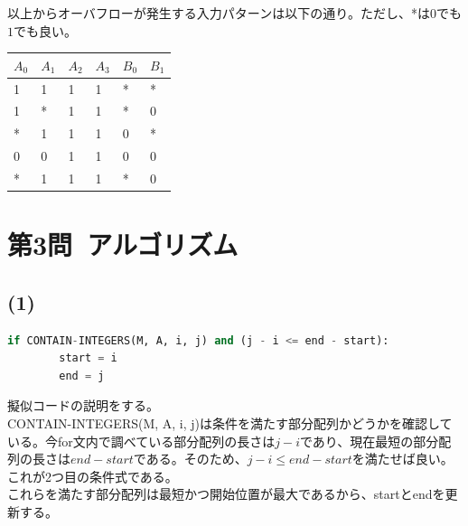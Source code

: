 \documentclass[a4paper,12pt,xelatex,ja=standard]{bxjsarticle}
\begin{document}
  以上からオーバフローが発生する入力パターンは以下の通り。ただし、*は$0$でも$1$でも良い。
  \begin{center}
    \centering
    \begin{tabular}{ |l|l|l|l|l|l| }
    \hline
    $A_0$ & $A_1$ & $A_2$ & $A_3$ & $B_0$ & $B_1$ \\ \hline \hline
    1  & 1  & 1  & 1  & *  & *  \\ \hline
    1  & *  & 1  & 1  & *  & 0  \\ \hline
    *  & 1  & 1  & 1  & 0  & *  \\ \hline
    0  & 0  & 1  & 1  & 0  & 0  \\ \hline
    *  & 1  & 1  & 1  & *  & 0  \\ \hline
    \end{tabular}
  \end{center}

\section*{第3問\ アルゴリズム}
  \subsection*{(1)}
  \begin{lstlisting}[language=Python]
    if CONTAIN-INTEGERS(M, A, i, j) and (j - i <= end - start):
        start = i
        end = j
  \end{lstlisting}
  擬似コードの説明をする。\\
  CONTAIN-INTEGERS(M, A, i, j)は条件を満たす部分配列かどうかを確認している。今for文内で調べている部分配列の長さは$j-i$であり、現在最短の部分配列の長さは$end-start$である。そのため、$j-i \leq end-start$を満たせば良い。これが2つ目の条件式である。\\
  これらを満たす部分配列は最短かつ開始位置が最大であるから、startとendを更新する。
\end{document}

